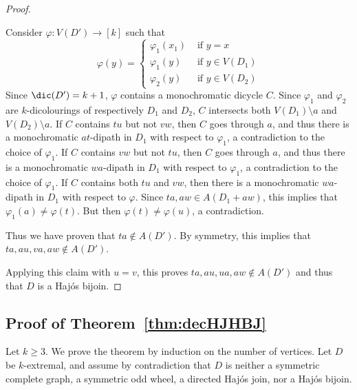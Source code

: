 \begin{proof}
\begin{proofclaim}
        Consider $\varphi:V(D') \rightarrow [k]$ such that           
        $$
        \varphi(y) = \left\{
            \begin{array}{ll}
                \varphi_1(x_1) & \text{ if } y=x \\
                \varphi_1(y)   & \text{ if } y \in V(D_1)\\ 
                \varphi_2(y)   & \text{ if } y \in V(D_2)
            \end{array}
        \right.
        $$  
        Since $\dic(D') = k+1$, $\varphi$ contains a monochromatic dicycle $C$. Since $\varphi_1$ and $\varphi_2$ are $k$-dicolourings of respectively $D_1$ and $D_2$, $C$ intersects both $V(D_1) \setminus a$ and $V(D_2) \setminus a$. 
        If $C$ contains $tu$ but not $vw$, then $C$ goes through $a$, and thus there is a monochromatic $at$-dipath in $D_1$ with respect to $\varphi_1$, a contradiction to the choice of $\varphi_1$. If $C$ contains $vw$ but not $tu$, then $C$ goes through $a$, and thus there is a monochromatic $wa$-dipath in $D_1$ with respect to $\varphi_1$, a contradiction to the choice of $\varphi_1$. If $C$ contains both $tu$ and $vw$, then there is a monochromatic $wa$-dipath in $D_1$ with respect to $\varphi$. Since $ta, aw \in A(D_1 + aw)$, this implies that $\varphi_1(a) \neq \varphi(t)$. But then $\varphi(t) \neq \varphi(u)$, a contradiction.

        Thus we have proven that $ta \notin A(D')$. By symmetry, this implies that $ta,au,va,aw \notin A(D')$.
    \end{proofclaim}

    Applying this claim with $u = v$, this proves $ta, au, ua, aw \notin A(D')$ and thus that $D$ is a Haj\'os bijoin.

\end{proof} 




\subsection{Proof of Theorem~\ref{thm:decHJHBJ}}
    
    Let $k \geq 3$. 
    We prove the theorem by induction on the number of vertices.  Let $D$ be $k$-extremal, and assume by contradiction that $D$ is neither a symmetric complete graph,  a symmetric odd wheel, a directed Haj\'os  join, nor a Haj\'os bijoin. 


